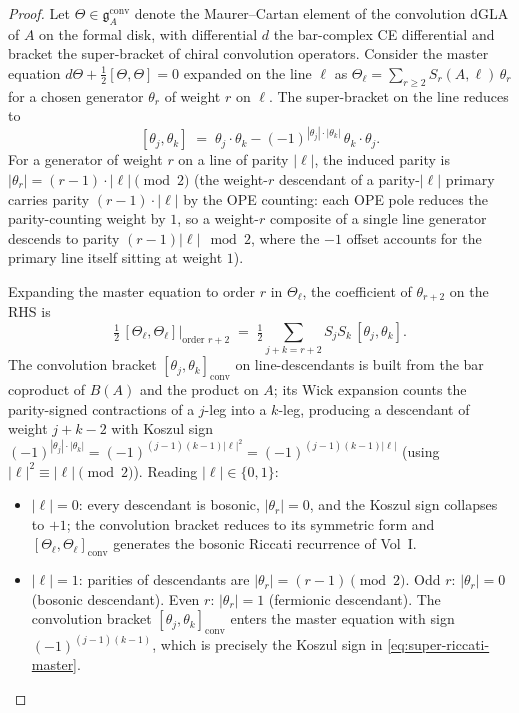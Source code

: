 \begin{proof}[Proof]
Let $\Theta \in \mathfrak{g}_A^{\mathrm{conv}}$ denote the
Maurer--Cartan element of the convolution dGLA of $A$ on the formal
disk, with differential $d$ the bar-complex CE differential and
bracket the super-bracket of chiral convolution operators. Consider
the master equation $d\Theta + \tfrac{1}{2}[\Theta, \Theta] = 0$
expanded on the line $\ell$ as
$\Theta_\ell = \sum_{r \ge 2} S_r(A, \ell) \, \theta_r$
for a chosen generator $\theta_r$ of weight $r$ on $\ell$. The
super-bracket on the line reduces to
\[
[\theta_j, \theta_k]
\;=\; \theta_j \cdot \theta_k - (-1)^{|\theta_j| \cdot |\theta_k|} \,
 \theta_k \cdot \theta_j.
\]
For a generator of weight $r$ on a line of parity $|\ell|$, the
induced parity is
$|\theta_r| = (r - 1) \cdot |\ell| \pmod{2}$
(the weight-$r$ descendant of a parity-$|\ell|$ primary carries parity
$(r - 1) \cdot |\ell|$ by the OPE counting: each OPE pole reduces the
parity-counting weight by $1$, so a weight-$r$ composite of a single
line generator descends to parity $(r - 1) |\ell| \mod 2$, where the
$-1$ offset accounts for the primary line itself sitting at weight
$1$).

Expanding the master equation to order $r$ in $\Theta_\ell$, the
coefficient of $\theta_{r+2}$ on the RHS is
\[
\tfrac{1}{2}\,[\Theta_\ell, \Theta_\ell]|_{\text{order } r+2}
\;=\; \tfrac{1}{2}
\sum_{j + k = r + 2} S_j S_k \, [\theta_j, \theta_k].
\]
The convolution bracket $[\theta_j, \theta_k]_{\mathrm{conv}}$ on
line-descendants is built from the bar coproduct of $B(A)$ and the
product on $A$; its Wick expansion counts the parity-signed
contractions of a $j$-leg into a $k$-leg, producing a descendant
of weight $j + k - 2$ with Koszul sign
$(-1)^{|\theta_j|\cdot|\theta_k|} = (-1)^{(j-1)(k-1)|\ell|^2} =
(-1)^{(j-1)(k-1)|\ell|}$ (using $|\ell|^2 \equiv |\ell| \pmod 2$).
Reading $|\ell| \in \{0, 1\}$:
\begin{itemize}[nosep]
\item $|\ell| = 0$: every descendant is bosonic, $|\theta_r| = 0$, and
 the Koszul sign collapses to $+1$; the convolution bracket reduces
 to its symmetric form and $[\Theta_\ell, \Theta_\ell]_{\mathrm{conv}}$
 generates the bosonic Riccati recurrence of Vol~I.
\item $|\ell| = 1$: parities of descendants are $|\theta_r| = (r-1)
 \pmod 2$. Odd $r$: $|\theta_r| = 0$ (bosonic descendant). Even $r$:
 $|\theta_r| = 1$ (fermionic descendant). The convolution bracket
 $[\theta_j, \theta_k]_{\mathrm{conv}}$ enters the master equation
 with sign $(-1)^{(j-1)(k-1)}$, which is precisely the Koszul sign
 in \eqref{eq:super-riccati-master}.
\end{itemize}


\end{proof}
